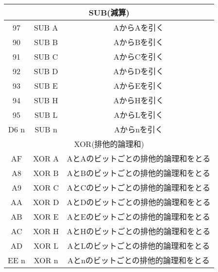 \begin{center}
\begin{tabular}{|c|c|c|}
\hline
\multicolumn{3}{|c|}{SUB(減算)}\\
\hline
97 & SUB A & AからAを引く\\ \hline
90 & SUB B & AからBを引く\\ \hline
91 & SUB C & AからCを引く\\ \hline
92 & SUB D & AからDを引く\\ \hline
93 & SUB E & AからEを引く\\ \hline
94 & SUB H & AからHを引く\\ \hline
95 & SUB L & AからLを引く\\ \hline
D6 n & SUB n & Aからnを引く\\ \hline
\hline
\multicolumn{3}{|c|}{XOR(排他的論理和)}\\
\hline
AF &XOR A& AとAのビットごとの排他的論理和をとる \\ \hline
A8 &XOR B& AとBのビットごとの排他的論理和をとる\\ \hline
A9 &XOR C& AとCのビットごとの排他的論理和をとる\\ \hline
AA &XOR D& AとDのビットごとの排他的論理和をとる\\ \hline
AB &XOR E& AとEのビットごとの排他的論理和をとる\\ \hline
AC &XOR H& AとHのビットごとの排他的論理和をとる\\ \hline
AD &XOR L& AとLのビットごとの排他的論理和をとる\\ \hline
EE n&XOR n& Aとnのビットごとの排他的論理和をとる\\ \hline
\end{tabular}
\end{center}
